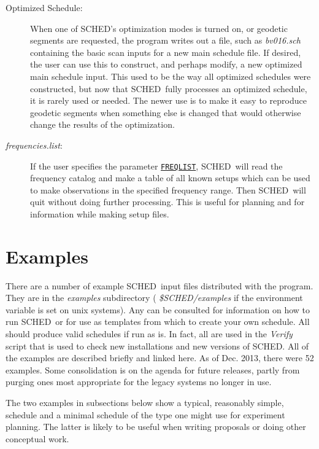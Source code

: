 \documentclass{report}
\newcommand{\sched}{{\sc SCHED}}
\newcommand{\schedb}{{\sc SCHED~}}
\begin{document}
\begin{description}
\item[Optimized Schedule:] When one of \sched's optimization modes is
turned on, or geodetic segments are requested, the program writes out
a file, such as {\sl bv016.sch} containing the basic scan inputs for a
new main schedule file.  If desired, the user can use this to
construct, and perhaps modify, a new optimized main schedule input.
This used to be the way all optimized schedules were constructed, but
now that \schedb fully processes an optimized schedule, it is rarely
used or needed.  The newer use is to make it easy to reproduce
geodetic segments when something else is changed that would otherwise
change the results of the optimization.

\item[{\sl frequencies.list}:]  If the user specifies the parameter
{\hyperref[MP:FREQLIST]{{\tt FREQLIST}}}, \schedb will read the
frequency catalog and make a table of all known setups which can
be used to make observations in the specified frequency range.  Then
\schedb will quit without doing further processing.  This is useful
for planning and for information while making setup files.

\end{description}



\section{\label{SEC:EXAMPLES}Examples}

There are a number of example \schedb input files distributed with the
program.  They are in the {\sl examples} subdirectory ({\sl
\$SCHED/examples} if the environment variable is set on unix systems).
Any can be consulted for information on how to run \schedb or for use
as templates from which to create your own schedule.  All should
produce valid schedules if run as is.  In fact, all are used in the
{\sl Verify} script that is used to check new installations and new
versions of \sched.  All of the examples are described briefly and
linked here.  As of Dec. 2013, there were 52 examples.  Some
consolidation is on the agenda for future releases, partly from purging
ones most appropriate for the legacy systems no longer in use.

The two examples in subsections below show a typical, reasonably
simple, schedule and a minimal schedule of the type one might use for
experiment planning.  The latter is likely to be useful when writing
proposals or doing other conceptual work.
\end{document}
